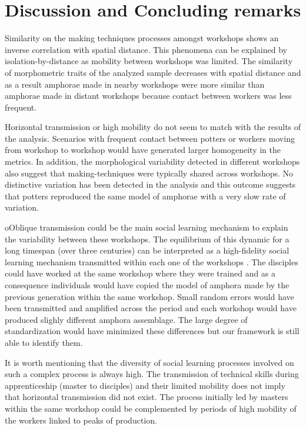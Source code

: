 \documentclass[review]{elsarticle}
\begin{document}
\section{Discussion and Concluding remarks}

Similarity on the making techniques processes amongst workshops shows an inverse correlation with spatial distance. This phenomena can be explained by isolation-by-distance as mobility between workshops was limited. The similarity of morphometric traits of the analyzed sample decreases with spatial distance and as a result amphorae made in nearby workshops were more similar than amphorae made in distant workshops because contact between workers was less frequent. 

Horizontal transmission or high mobility do not seem to match with the results of the analysis. Scenarios with frequent contact between potters or workers moving from workshop to workshop would have generated larger homogeneity in the metrics. In addition, the morphological variability detected in different workshops also suggest that making-techniques were typically shared across workshops. No distinctive variation has been detected in the analysis and this outcome suggests that potters reproduced the same model of amphorae with a very slow rate of variation.
  

oOblique transmission could be the main social learning mechanism to explain the variability between these workshops. The equilibrium of this dynamic for a long timespan (over three centuries) can be interpreted as a high-fidelity social learning mechanism transmitted within each one of the workshops \citep{schillinger_copying_2016}. The disciples could have worked at the same workshop where they were trained and as a consequence individuals would have copied the model of amphora made by the previous generation within the same workshop. Small random errors would have been transmitted and amplified across the period and each workshop would have produced slighly different amphora assemblage. The large degree of standardization would have minimized these differences but our framework is still able to identify them.

It is worth mentioning that the diversity of social learning processes involved on such a complex process is always high. The transmission of technical skills during apprenticeship (master to disciples) and their limited mobility does not imply that horizontal transmission did not exist. The process initially led by masters within the same workshop could be complemented by periods of high mobility of the workers linked to peaks of production.
\end{document}
